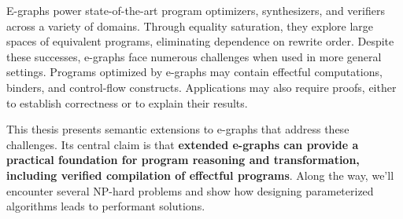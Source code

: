 E-graphs power state-of-the-art program optimizers, synthesizers, and verifiers
  across a variety of domains.
Through equality saturation, they explore large spaces of equivalent programs,
  eliminating dependence on rewrite order.
Despite these successes, e-graphs face numerous challenges
  when used in more general settings.
Programs optimized by e-graphs may contain effectful computations,
  binders, and control-flow constructs.
Applications may also require proofs,
  either to establish correctness or to explain their results.

This thesis presents semantic extensions to e-graphs that address these challenges.
Its central claim is that \textbf{extended e-graphs can provide a practical foundation
  for program reasoning and transformation, including verified compilation
  of effectful programs}.
Along the way, we'll encounter several NP-hard problems and show how
  designing parameterized algorithms leads to performant solutions.
